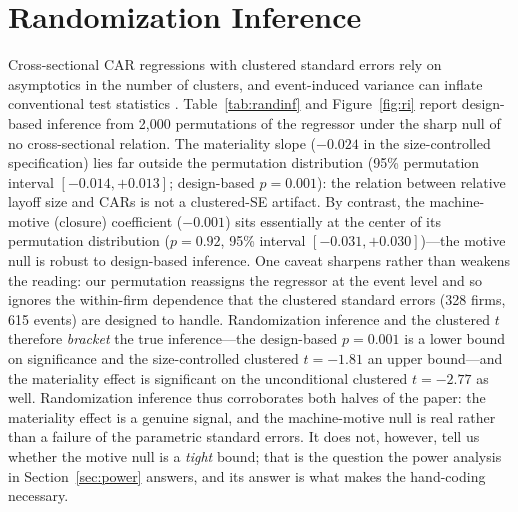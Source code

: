 \documentclass[12pt]{article}
\begin{document}
\section{Randomization Inference}\label{sec:ri}
Cross-sectional CAR regressions with clustered standard errors rely on asymptotics
in the number of clusters, and event-induced variance can inflate conventional
test statistics \citep{boehmer1991,kolari2010}. Table~\ref{tab:randinf} and
Figure~\ref{fig:ri} report design-based inference from 2{,}000 permutations of the
regressor under the sharp null of no cross-sectional relation. The materiality
slope ($-0.024$ in the size-controlled specification) lies far outside the
permutation distribution (95\% permutation interval $[-0.014,+0.013]$; design-based
$p=0.001$): the relation between relative layoff size and CARs is not a
clustered-SE artifact. By contrast, the machine-motive (closure) coefficient
($-0.001$) sits essentially at the center of its permutation distribution
($p=0.92$, 95\% interval $[-0.031,+0.030]$)---the motive null is robust to
design-based inference. One caveat sharpens rather than weakens the reading: our
permutation reassigns the regressor at the event level and so ignores the
within-firm dependence that the clustered standard errors (328 firms, 615 events)
are designed to handle. Randomization inference and the clustered $t$ therefore
\emph{bracket} the true inference---the design-based $p=0.001$ is a lower bound on
significance and the size-controlled clustered $t=-1.81$ an upper bound---and the
materiality effect is significant on the unconditional clustered $t=-2.77$ as well. Randomization inference thus corroborates both halves of
the paper: the materiality effect is a genuine signal, and the machine-motive null
is real rather than a failure of the parametric standard errors. It does not,
however, tell us whether the motive null is a \emph{tight} bound; that is the
question the power analysis in Section~\ref{sec:power} answers, and its answer is
what makes the hand-coding necessary.
\end{document}
